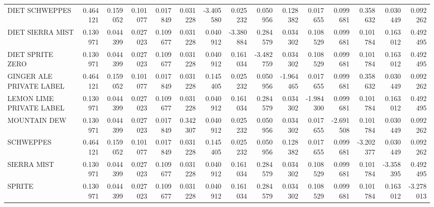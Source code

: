 \begin{tabular}{lrrrrrrrrrrrrrr}
DIET SCHWEPPES                &    0.464121 &         0.159052 &                       0.101077 &                       0.017849 &           0.031228 &       -3.405580 &          0.025232 &          0.050956 &                  0.128382 &                  0.017655 &      0.099681 &   0.358632 &     0.030449 &  0.092262 \\
DIET SIERRA MIST              &    0.130971 &         0.044399 &                       0.027023 &                       0.109677 &           0.031228 &        0.040912 &         -3.380884 &          0.284579 &                  0.034302 &                  0.108529 &      0.099681 &   0.101784 &     0.163012 &  0.492495 \\
DIET SPRITE ZERO              &    0.130971 &         0.044399 &                       0.027023 &                       0.109677 &           0.031228 &        0.040912 &          0.161034 &         -3.482759 &                  0.034302 &                  0.108529 &      0.099681 &   0.101784 &     0.163012 &  0.492495 \\
GINGER ALE PRIVATE LABEL      &    0.464121 &         0.159052 &                       0.101077 &                       0.017849 &           0.031228 &        0.145405 &          0.025232 &          0.050956 &                 -1.964465 &                  0.017655 &      0.099681 &   0.358632 &     0.030449 &  0.092262 \\
LEMON LIME PRIVATE LABEL      &    0.130971 &         0.044399 &                       0.027023 &                       0.109677 &           0.031228 &        0.040912 &          0.161034 &          0.284579 &                  0.034302 &                 -1.984300 &      0.099681 &   0.101784 &     0.163012 &  0.492495 \\
MOUNTAIN DEW                  &    0.130971 &         0.044399 &                       0.027023 &                       0.017849 &           0.342307 &        0.040912 &          0.025232 &          0.050956 &                  0.034302 &                  0.017655 &     -2.691508 &   0.101784 &     0.030449 &  0.092262 \\
SCHWEPPES                     &    0.464121 &         0.159052 &                       0.101077 &                       0.017849 &           0.031228 &        0.145405 &          0.025232 &          0.050956 &                  0.128382 &                  0.017655 &      0.099681 &  -3.202377 &     0.030449 &  0.092262 \\
SIERRA MIST                   &    0.130971 &         0.044399 &                       0.027023 &                       0.109677 &           0.031228 &        0.040912 &          0.161034 &          0.284579 &                  0.034302 &                  0.108529 &      0.099681 &   0.101784 &    -3.358395 &  0.492495 \\
SPRITE                        &    0.130971 &         0.044399 &                       0.027023 &                       0.109677 &           0.031228 &        0.040912 &          0.161034 &          0.284579 &                  0.034302 &                  0.108529 &      0.099681 &   0.101784 &     0.163012 & -3.278013 \\
\bottomrule
\end{tabular}
